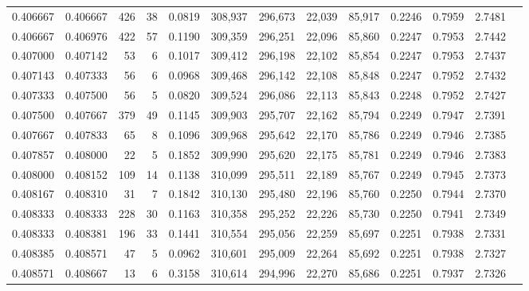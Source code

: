 \begin{tabular}{rrrrrrrrrrrrr}
0.406667 & 0.406667 &   426 &  38 &                                     0.0819 & 308,937 & 296,673 &  22,039 &  85,917 & 0.2246 & 0.7959 & 2.7481 \\
0.406667 & 0.406976 &   422 &  57 &                                     0.1190 & 309,359 & 296,251 &  22,096 &  85,860 & 0.2247 & 0.7953 & 2.7442 \\
0.407000 & 0.407142 &    53 &   6 &                                     0.1017 & 309,412 & 296,198 &  22,102 &  85,854 & 0.2247 & 0.7953 & 2.7437 \\
0.407143 & 0.407333 &    56 &   6 &                                     0.0968 & 309,468 & 296,142 &  22,108 &  85,848 & 0.2247 & 0.7952 & 2.7432 \\
0.407333 & 0.407500 &    56 &   5 &                                     0.0820 & 309,524 & 296,086 &  22,113 &  85,843 & 0.2248 & 0.7952 & 2.7427 \\
0.407500 & 0.407667 &   379 &  49 &                                     0.1145 & 309,903 & 295,707 &  22,162 &  85,794 & 0.2249 & 0.7947 & 2.7391 \\
0.407667 & 0.407833 &    65 &   8 &                                     0.1096 & 309,968 & 295,642 &  22,170 &  85,786 & 0.2249 & 0.7946 & 2.7385 \\
0.407857 & 0.408000 &    22 &   5 &                                     0.1852 & 309,990 & 295,620 &  22,175 &  85,781 & 0.2249 & 0.7946 & 2.7383 \\
0.408000 & 0.408152 &   109 &  14 &                                     0.1138 & 310,099 & 295,511 &  22,189 &  85,767 & 0.2249 & 0.7945 & 2.7373 \\
0.408167 & 0.408310 &    31 &   7 &                                     0.1842 & 310,130 & 295,480 &  22,196 &  85,760 & 0.2250 & 0.7944 & 2.7370 \\
0.408333 & 0.408333 &   228 &  30 &                                     0.1163 & 310,358 & 295,252 &  22,226 &  85,730 & 0.2250 & 0.7941 & 2.7349 \\
0.408333 & 0.408381 &   196 &  33 &                                     0.1441 & 310,554 & 295,056 &  22,259 &  85,697 & 0.2251 & 0.7938 & 2.7331 \\
0.408385 & 0.408571 &    47 &   5 &                                     0.0962 & 310,601 & 295,009 &  22,264 &  85,692 & 0.2251 & 0.7938 & 2.7327 \\
0.408571 & 0.408667 &    13 &   6 &                                     0.3158 & 310,614 & 294,996 &  22,270 &  85,686 & 0.2251 & 0.7937 & 2.7326 \\

\end{tabular}

